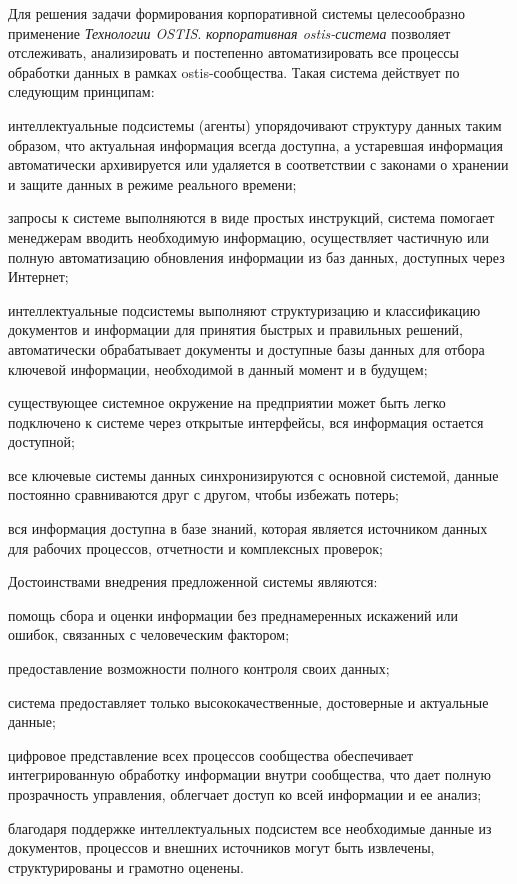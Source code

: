 Для решения задачи формирования корпоративной системы целесообразно применение \textit{Технологии OSTIS}. \textit{корпоративная ostis-система} позволяет отслеживать, анализировать и постепенно автоматизировать все процессы обработки данных в рамках ostis-сообщества. 
Такая система действует по следующим принципам:
\begin{textitemize}
    \item интеллектуальные подсистемы (агенты) упорядочивают структуру данных таким образом, что актуальная информация всегда доступна, а устаревшая информация автоматически архивируется или удаляется в соответствии с законами о хранении и защите данных в режиме реального времени;
    \item запросы к системе выполняются в виде простых инструкций, система помогает менеджерам вводить необходимую информацию, осуществляет частичную или полную автоматизацию обновления информации из баз данных, доступных через Интернет;
    \item интеллектуальные подсистемы выполняют структуризацию и классификацию документов и информации для принятия быстрых и правильных решений, автоматически обрабатывает документы и доступные базы данных для отбора ключевой информации, необходимой в данный момент и в будущем;
    \item существующее системное окружение на предприятии может быть легко подключено к системе через открытые интерфейсы, вся информация остается доступной;
    \item все ключевые системы данных синхронизируются с основной системой, данные постоянно сравниваются друг с другом, чтобы избежать потерь;
    \item вся информация доступна в базе знаний, которая является источником данных для рабочих процессов, отчетности и комплексных проверок;
\end{textitemize}

Достоинствами внедрения предложенной системы являются:
\begin{textitemize}
    \item помощь сбора и оценки информации без преднамеренных искажений или ошибок, связанных с человеческим фактором;
    \item предоставление возможности полного контроля своих данных;
    \item система предоставляет только высококачественные, достоверные и актуальные данные;
    \item цифровое представление всех процессов сообщества обеспечивает интегрированную обработку информации внутри сообщества, что дает полную прозрачность управления, облегчает доступ ко всей информации и ее анализ;
    \item благодаря поддержке интеллектуальных подсистем все необходимые данные из документов, процессов и внешних источников могут быть извлечены, структурированы и грамотно оценены.
\end{textitemize}

